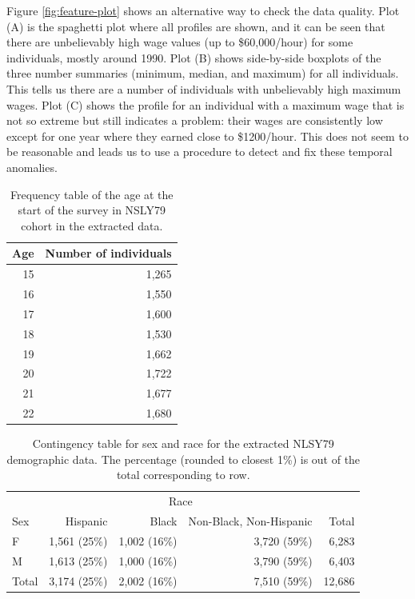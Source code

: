 \documentclass{article}
\begin{document}
Figure \ref{fig:feature-plot} shows an alternative way to check the data quality. Plot (A) is the spaghetti plot where all profiles are shown, and it can be seen that there are unbelievably high wage values (up to \$60,000/hour) for some individuals, mostly around 1990. Plot (B) shows side-by-side boxplots of the three number summaries (minimum, median, and maximum) for all individuals. This tells us there are a number of individuals with unbelievably high maximum wages. Plot (C) shows the profile for an individual with a maximum wage that is not so extreme but still indicates a problem: their wages are consistently low except for one year where they earned close to \$1200/hour. This does not seem to be reasonable and leads us to use a procedure to detect and fix these temporal anomalies.

\begin{table}

\caption{\label{tab:age-table}Frequency table of the age at the start of the survey in NSLY79 cohort in the extracted data.}
\centering
\begin{tabular}[t]{rr}
\toprule
Age & Number of individuals\\
\midrule
15 & 1,265\\
16 & 1,550\\
17 & 1,600\\
18 & 1,530\\
19 & 1,662\\
20 & 1,722\\
21 & 1,677\\
22 & 1,680\\
\bottomrule
\end{tabular}
\end{table}

\begin{table}

\caption{\label{tab:gender-race-table}Contingency table for sex and race for the extracted NLSY79 demographic data. The percentage (rounded to closest 1\%) is out of the total corresponding to row.}
\centering
\begin{tabular}[t]{lrrrr}
\toprule
\multicolumn{1}{c}{ } & \multicolumn{3}{c}{Race} & \multicolumn{1}{c}{ } \\
\cmidrule(l{3pt}r{3pt}){2-4}
Sex & Hispanic & Black & Non-Black, Non-Hispanic & Total\\
\midrule
F & 1,561 (25\%) & 1,002 (16\%) & 3,720 (59\%) & 6,283\\
M & 1,613 (25\%) & 1,000 (16\%) & 3,790 (59\%) & 6,403\\
\midrule
Total & 3,174 (25\%) & 2,002 (16\%) & 7,510 (59\%) & 12,686\\
\bottomrule
\end{tabular}
\end{table}
\end{document}
